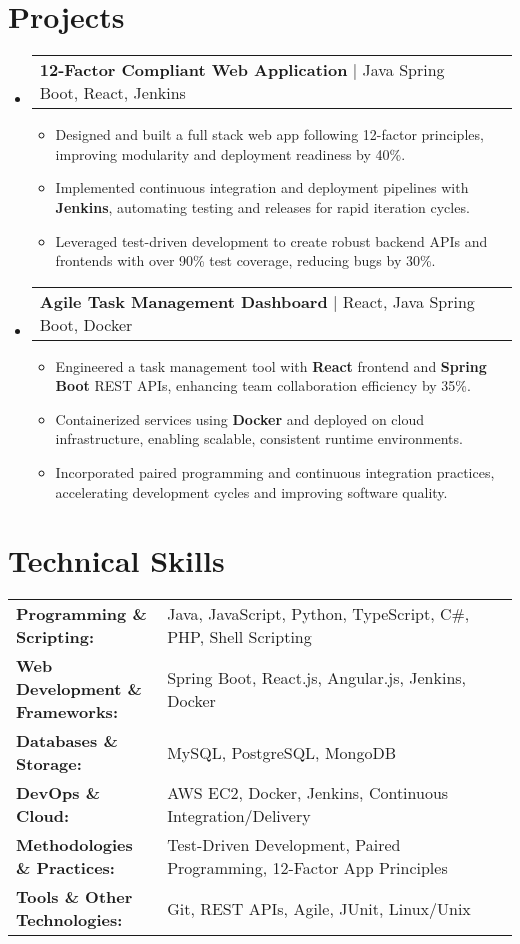 \documentclass[letterpaper,11pt]{article}
\makeatletter
\newcommand{\resumeItem}[1]{
  \item\footnotesize{
    {#1 \vspace{-2pt}}
  }
}
\newcommand{\resumeProjectHeading}[2]{
    \item
    \begin{tabular*}{1.001\textwidth}{l@{\extracolsep{\fill}}r}
      \small#1 & \textbf{\small #2}\\
    \end{tabular*}\vspace{-7pt}
}
\newcommand{\resumeSubHeadingListStart}{\begin{itemize}[leftmargin=0pt, label={}]}
\newcommand{\resumeSubHeadingListEnd}{\end{itemize}}
\newcommand{\resumeItemListStart}{\begin{itemize}[leftmargin=*]}
\newcommand{\resumeItemListEnd}{\end{itemize}\vspace{-5pt}}
\makeatother
\begin{document}
\section{Projects}
    \vspace{-5pt}
    \resumeSubHeadingListStart
      \resumeProjectHeading
          {\textbf{12-Factor Compliant Web Application} | Java Spring Boot, React, Jenkins}{}
          \resumeItemListStart
              \resumeItem{Designed and built a full stack web app following 12-factor principles, improving modularity and deployment readiness by 40\%.}
              \resumeItem{Implemented continuous integration and deployment pipelines with \textbf{Jenkins}, automating testing and releases for rapid iteration cycles.}
              \resumeItem{Leveraged test-driven development to create robust backend APIs and frontends with over 90\% test coverage, reducing bugs by 30\%.}
          \resumeItemListEnd
          \vspace{-16pt}
      \resumeProjectHeading
          {\textbf{Agile Task Management Dashboard} | React, Java Spring Boot, Docker}{}
          \resumeItemListStart
              \resumeItem{Engineered a task management tool with \textbf{React} frontend and \textbf{Spring Boot} REST APIs, enhancing team collaboration efficiency by 35\%.}
              \resumeItem{Containerized services using \textbf{Docker} and deployed on cloud infrastructure, enabling scalable, consistent runtime environments.}
              \resumeItem{Incorporated paired programming and continuous integration practices, accelerating development cycles and improving software quality.}
          \resumeItemListEnd
    \resumeSubHeadingListEnd
\vspace{-10pt}
\section{Technical Skills}
        \vspace{-14pt}
        \begin{table}[h]
            \footnotesize
            \begin{tabular}{p{0.3\linewidth} p{0.7\linewidth}}
                \textbf{Programming \& Scripting:} & Java, JavaScript, Python, TypeScript, C\#, PHP, Shell Scripting \\
                \textbf{Web Development \& Frameworks:} & Spring Boot, React.js, Angular.js, Jenkins, Docker \\
                \textbf{Databases \& Storage:} & MySQL, PostgreSQL, MongoDB \\
                \textbf{DevOps \& Cloud:} & AWS EC2, Docker, Jenkins, Continuous Integration/Delivery \\
                \textbf{Methodologies \& Practices:} & Test-Driven Development, Paired Programming, 12-Factor App Principles \\
                \textbf{Tools \& Other Technologies:} & Git, REST APIs, Agile, JUnit, Linux/Unix \\
            \end{tabular}
        \end{table}
\end{document}
